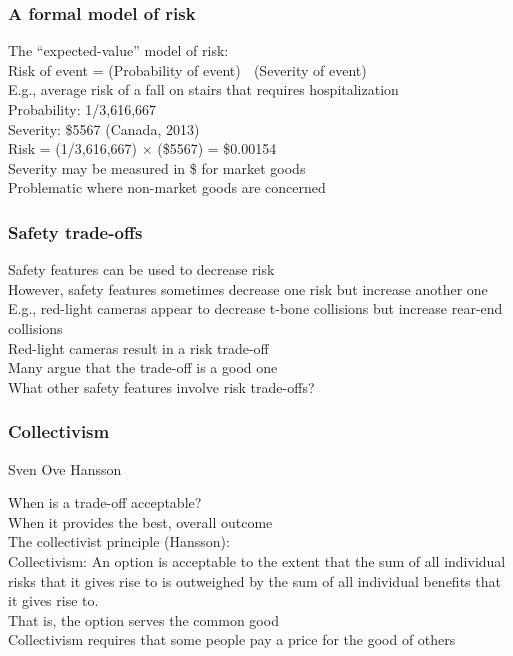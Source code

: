 \documentclass{article}
\begin{document}
\subsubsection*{A formal model of risk}
\label{ssub:a_formal_model_of_risk}


The “expected-value” model of risk:\\
Risk of event = (Probability of event)  (Severity of event)\\
E.g., average risk of a fall on stairs that requires hospitalization\\
Probability: 1/3,616,667\\
Severity: \$5567 (Canada, 2013)\\
Risk = (1/3,616,667) × (\$5567) = \$0.00154\\
Severity may be measured in \$ for market goods\\
Problematic where non-market goods are concerned\\
\subsubsection*{Safety trade-offs}
\label{ssub:safety_trade_offs}


Safety features can be used to decrease risk\\
However, safety features sometimes decrease one risk but increase another one\\
E.g., red-light cameras appear to decrease t-bone collisions but increase rear-end collisions\\
Red-light cameras result in a risk trade-off\\
Many argue that the trade-off is a good one\\
What other safety features involve risk trade-offs?\\
\subsubsection*{Collectivism}
\label{ssub:collectivism}

{Sven Ove Hansson}


When is a trade-off acceptable?\\
When it provides the best, overall outcome\\
The collectivist principle (Hansson):\\
Collectivism: An option is acceptable to the extent that the sum of all individual risks that it gives rise to is outweighed by the sum of all individual benefits that it gives rise to.\\
That is, the option serves the common good\\
Collectivism requires that some people pay a price for the good of others\\
\end{document}
